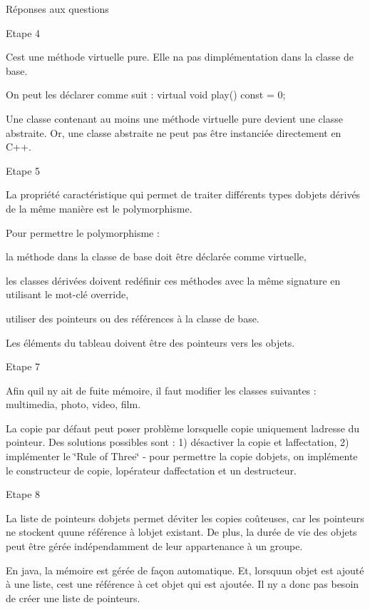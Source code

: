 Réponses aux questions

Etape 4

C\textquotesingle{}est une méthode virtuelle pure. Elle n\textquotesingle{}a pas d\textquotesingle{}implémentation dans la classe de base.

On peut les déclarer comme suit \+: virtual void play() const = 0;

Une classe contenant au moins une méthode virtuelle pure devient une classe abstraite. Or, une classe abstraite ne peut pas être instanciée directement en C++.

Etape 5

La propriété caractéristique qui permet de traiter différents types d\textquotesingle{}objets dérivés de la même manière est le polymorphisme.

Pour permettre le polymorphisme \+:
\begin{DoxyItemize}
\item la méthode dans la classe de base doit être déclarée comme virtuelle,
\item les classes dérivées doivent redéfinir ces méthodes avec la même signature en utilisant le mot-\/clé override,
\item utiliser des pointeurs ou des références à la classe de base.
\end{DoxyItemize}

Les éléments du tableau doivent être des pointeurs vers les objets.

Etape 7

Afin qu\textquotesingle{}il n\textquotesingle{}y ait de fuite mémoire, il faut modifier les classes suivantes \+: multimedia, photo, video, film.

La copie par défaut peut poser problème lorsqu\textquotesingle{}elle copie uniquement l\textquotesingle{}adresse du pointeur. Des solutions possibles sont \+: 1) désactiver la copie et l\textquotesingle{}affectation, 2) implémenter le \char`\"{}\+Rule of Three\char`\"{} -\/ pour permettre la copie d\textquotesingle{}objets, on implémente le constructeur de copie, l\textquotesingle{}opérateur d\textquotesingle{}affectation et un destructeur.

Etape 8

La liste de pointeurs d\textquotesingle{}objets permet d\textquotesingle{}éviter les copies coûteuses, car les pointeurs ne stockent qu\textquotesingle{}une référence à l\textquotesingle{}objet existant. De plus, la durée de vie des objets peut être gérée indépendamment de leur appartenance à un groupe.

En java, la mémoire est gérée de façon automatique. Et, lorsqu\textquotesingle{}un objet est ajouté à une liste, c\textquotesingle{}est une référence à cet objet qui est ajoutée. Il n\textquotesingle{}y a donc pas besoin de créer une liste de pointeurs. 